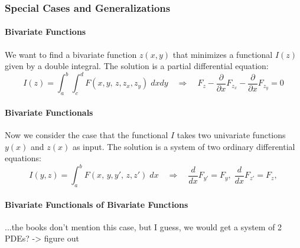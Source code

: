 \subsubsection{Special Cases and Generalizations}


\paragraph{Bivariate Functions} We want to find a bivariate function $z(x,y)$ that minimizes a functional $I(z)$ given by a double integral. The solution is a partial differential equation:
\begin{equation}
 I(z) = \int_a^b \int_c^d  F(x,y, \, z,z_x,z_y ) \; dx dy
 \quad \Rightarrow \quad
  F_z - \frac{\partial}{\partial x} F_{z_x} - \frac{\partial}{\partial x} F_{z_y} = 0
\end{equation}

\paragraph{Bivariate Functionals} Now we consider the case that the functional $I$ takes two univariate functions $y(x)$ and $z(x)$ as input. The solution is a system of two ordinary differential equations:
\begin{equation}
 I(y,z) = \int_a^b F(x, \, y,y', \, z,z') \; dx
 \quad \Rightarrow \quad
 \frac{d}{d x} F_{y'} = F_y, \;  \frac{d}{d x} F_{z'} = F_z,
\end{equation}


\paragraph{Bivariate Functionals of Bivariate Functions} ...the books don't mention this case, but I guess, we would get a system of 2 PDEs? -> figure out


